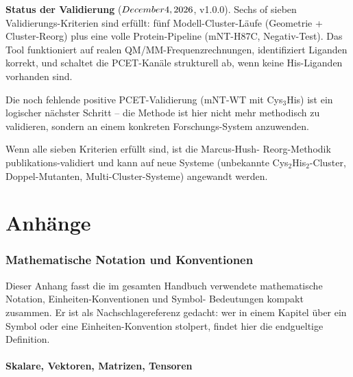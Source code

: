 \documentclass[11pt,a4paper,twoside]{article}
\theoremstyle{remark}
\begin{document}
\begin{infobox}
\textbf{Status der Validierung} ($\today$, v1.0.0).
Sechs of sieben Validierungs-Kriterien sind erf\"ullt: f\"unf
Modell-Cluster-L\"aufe (Geometrie + Cluster-Reorg) plus eine
volle Protein-Pipeline (mNT-H87C, Negativ-Test). Das Tool
funktioniert auf realen QM/MM-Frequenzrechnungen, identifiziert
Liganden korrekt, und schaltet die PCET-Kan\"ale strukturell ab,
wenn keine His-Liganden vorhanden sind.

Die noch fehlende positive PCET-Validierung (mNT-WT mit Cys$_3$His)
ist ein logischer n\"achster Schritt -- die Methode ist hier nicht
mehr methodisch zu validieren, sondern an einem konkreten
Forschungs-System anzuwenden.
\end{infobox}

Wenn alle sieben Kriterien erf\"ullt sind, ist die Marcus-Hush-
Reorg-Methodik publikations-validiert und kann auf neue Systeme
(unbekannte Cys$_2$His$_2$-Cluster, Doppel-Mutanten,
Multi-Cluster-Systeme) angewandt werden.

\appendix

\part{Anh\"ange}

\section{Mathematische Notation und Konventionen}
\label{app:notation}

Dieser Anhang fasst die im gesamten Handbuch verwendete
mathematische Notation, Einheiten-Konventionen und Symbol-
Bedeutungen kompakt zusammen. Er ist als Nachschlagereferenz
gedacht: wer in einem Kapitel \"uber ein Symbol oder eine
Einheiten-Konvention stolpert, findet hier die endgueltige
Definition.

\subsection{Skalare, Vektoren, Matrizen, Tensoren}
\end{document}
